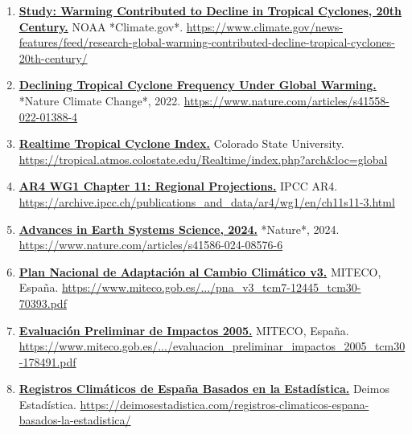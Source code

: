 \documentclass[
  10pt,
  a4paper,
  DIV=11,
  numbers=noendperiod,
  open=any]{scrreprt}
\numberwithin{equation}{chapter}
\numberwithin{equation}{section}
\renewcommand{\[}{\begin{equation}}
\renewcommand{\]}{\end{equation}}
\begin{document}
\begin{enumerate}
  \item \label{ref:web7}\href{https://www.climate.gov/news-features/feed/research-global-warming-contributed-decline-tropical-cyclones-20th-century/}{\textbf{Study: Warming Contributed to Decline in Tropical Cyclones, 20th Century.}} NOAA *Climate.gov*.  
  \url{https://www.climate.gov/news-features/feed/research-global-warming-contributed-decline-tropical-cyclones-20th-century/}

  \item \label{ref:web8}\href{https://www.nature.com/articles/s41558-022-01388-4}{\textbf{Declining Tropical Cyclone Frequency Under Global Warming.}} *Nature Climate Change*, 2022.  
  \url{https://www.nature.com/articles/s41558-022-01388-4}

  \item \label{ref:web9}\href{https://tropical.atmos.colostate.edu/Realtime/index.php?arch\&loc=global}{\textbf{Realtime Tropical Cyclone Index.}} Colorado State University.  
  \url{https://tropical.atmos.colostate.edu/Realtime/index.php?arch&loc=global}

  \item \label{ref:web10}\href{https://archive.ipcc.ch/publications_and_data/ar4/wg1/en/ch11s11-3.html}{\textbf{AR4 WG1 Chapter 11: Regional Projections.}} IPCC AR4.  
  \url{https://archive.ipcc.ch/publications_and_data/ar4/wg1/en/ch11s11-3.html}

  \item \label{ref:web11}\href{https://www.nature.com/articles/s41586-024-08576-6}{\textbf{Advances in Earth Systems Science, 2024.}} *Nature*, 2024.  
  \url{https://www.nature.com/articles/s41586-024-08576-6}

  \item \label{ref:web12}\href{https://www.miteco.gob.es/content/dam/miteco/es/cambio-climatico/temas/impactos-vulnerabilidad-y-adaptacion/pna_v3_tcm7-12445_tcm30-70393.pdf}{\textbf{Plan Nacional de Adaptación al Cambio Climático v3.}} MITECO, España.  
  \url{https://www.miteco.gob.es/.../pna_v3_tcm7-12445_tcm30-70393.pdf}

  \item \label{ref:web13}\href{https://www.miteco.gob.es/content/dam/miteco/es/cambio-climatico/temas/impactos-vulnerabilidad-y-adaptacion/evaluacion_preliminar_impactos_2005_tcm30-178491.pdf}{\textbf{Evaluación Preliminar de Impactos 2005.}} MITECO, España.  
  \url{https://www.miteco.gob.es/.../evaluacion_preliminar_impactos_2005_tcm30-178491.pdf}

  \item \label{ref:web14}\href{https://deimosestadistica.com/registros-climaticos-espana-basados-la-estadistica/}{\textbf{Registros Climáticos de España Basados en la Estadística.}} Deimos Estadística.  
  \url{https://deimosestadistica.com/registros-climaticos-espana-basados-la-estadistica/}


\end{enumerate}
\end{document}
